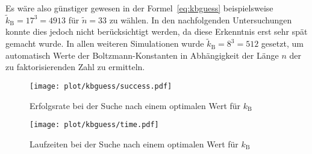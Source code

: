 Es wäre also günstiger gewesen in der Formel~\eqref{eq:kbguess} beispielsweise $\tilde{k}_\mathrm{B}=17^3=4913$ für $\tilde{n}=33$ zu wählen. In den nachfolgenden Untersuchungen konnte dies jedoch nicht berücksichtigt werden, da diese Erkenntnis erst sehr spät gemacht wurde. In allen weiteren Simulationen wurde $\tilde{k}_\mathrm{B}=8^3=512$ gesetzt, um automatisch Werte der Boltzmann-Konstanten in Abhängigkeit der Länge $n$ der zu faktorisierenden Zahl zu ermitteln.
\begin{figure}[ht]
		\centering
		\texttt{[image: plot/kbguess/success.pdf]}
		\caption{Erfolgsrate bei der Suche nach einem optimalen Wert für $k_\mathrm{B}$}\label{fig:kbguess-success}
\end{figure}
\begin{figure}[ht]
		\centering
		\texttt{[image: plot/kbguess/time.pdf]}
		\caption{Laufzeiten bei der Suche nach einem optimalen Wert für $k_\mathrm{B}$}\label{fig:kbguess-runtime}
\end{figure}

